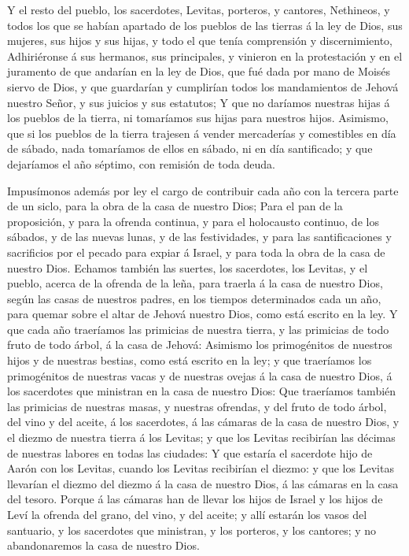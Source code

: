  Y el resto del pueblo, los sacerdotes, Levitas, porteros,
y cantores, Nethineos, y todos los que se habían apartado de los pueblos
de las tierras á la ley de Dios, sus mujeres, sus hijos y sus hijas, y
todo el que tenía comprensión y discernimiento, 
Adhiriéronse á sus hermanos, sus principales, y vinieron en la
protestación y en el juramento de que andarían en la ley de Dios, que
fué dada por mano de Moisés siervo de Dios, y que guardarían y
cumplirían todos los mandamientos de Jehová nuestro Señor, y sus juicios
y sus estatutos;  Y que no daríamos nuestras hijas á los
pueblos de la tierra, ni tomaríamos sus hijas para nuestros hijos.
 Asimismo, que si los pueblos de la tierra trajesen á
vender mercaderías y comestibles en día de sábado, nada tomaríamos de
ellos en sábado, ni en día santificado; y que dejaríamos el año séptimo,
con remisión de toda deuda.

 Impusímonos además por ley el cargo de contribuir cada año
con la tercera parte de un siclo, para la obra de la casa de nuestro
Dios;  Para el pan de la proposición, y para la ofrenda
continua, y para el holocausto continuo, de los sábados, y de las nuevas
lunas, y de las festividades, y para las santificaciones y sacrificios
por el pecado para expiar á Israel, y para toda la obra de la casa de
nuestro Dios.  Echamos también las suertes, los sacerdotes,
los Levitas, y el pueblo, acerca de la ofrenda de la leña, para traerla
á la casa de nuestro Dios, según las casas de nuestros padres, en los
tiempos determinados cada un año, para quemar sobre el altar de Jehová
nuestro Dios, como está escrito en la ley.  Y que cada año
traeríamos las primicias de nuestra tierra, y las primicias de todo
fruto de todo árbol, á la casa de Jehová:  Asimismo los
primogénitos de nuestros hijos y de nuestras bestias, como está escrito
en la ley; y que traeríamos los primogénitos de nuestras vacas y de
nuestras ovejas á la casa de nuestro Dios, á los sacerdotes que
ministran en la casa de nuestro Dios:  Que traeríamos
también las primicias de nuestras masas, y nuestras ofrendas, y del
fruto de todo árbol, del vino y del aceite, á los sacerdotes, á las
cámaras de la casa de nuestro Dios, y el diezmo de nuestra tierra á los
Levitas; y que los Levitas recibirían las décimas de nuestras labores en
todas las ciudades:  Y que estaría el sacerdote hijo de
Aarón con los Levitas, cuando los Levitas recibirían el diezmo: y que
los Levitas llevarían el diezmo del diezmo á la casa de nuestro Dios, á
las cámaras en la casa del tesoro.  Porque á las cámaras
han de llevar los hijos de Israel y los hijos de Leví la ofrenda del
grano, del vino, y del aceite; y allí estarán los vasos del santuario, y
los sacerdotes que ministran, y los porteros, y los cantores; y no
abandonaremos la casa de nuestro Dios.

